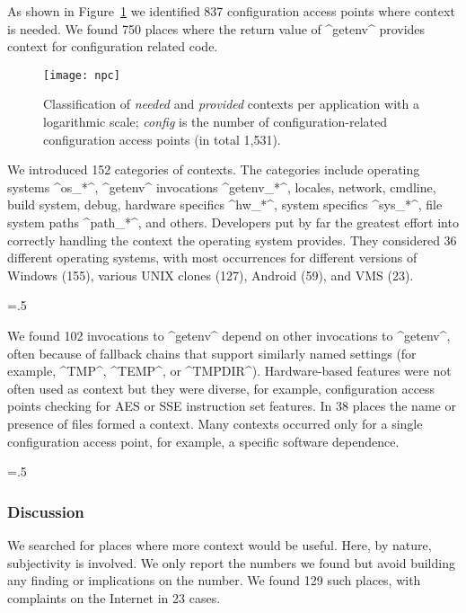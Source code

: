 As shown in Figure~\ref{fig:np} we identified 837 configuration access points where context is needed.
We found 750 places where the return value of ^getenv^ provides context for configuration related code.

\begin{figure}[htp]
\centering
\texttt{[image: npc]}
\caption[Classification of needed and provided contexts.]{%
Classification of \emph{needed} and \emph{provided} contexts per application with a logarithmic scale;
\emph{config} is the number of configuration-related configuration access points (in total 1,531).}
\label{fig:np}

\end{figure}

We introduced 152 categories of contexts.
The categories include operating systems ^os_*^, ^getenv^ invocations ^getenv_*^, locales, network, cmdline, build system, debug, hardware specifics ^hw_*^, system specifics ^sys_*^, file system paths ^path_*^, and others.
Developers put by far the greatest effort into correctly handling the context the operating system provides.
They considered 36 different operating systems, with most occurrences for different versions of Windows (155), various UNIX clones (127), Android (59), and VMS (23).%
{\parfillskip=0pt \emergencystretch=.5\textwidth \par}

We found 102 invocations to ^getenv^ depend on other invocations to ^getenv^, often because of fallback chains that support similarly named settings (for example, ^TMP^, ^TEMP^, or ^TMPDIR^).
Hardware-based features were not often used as context but they were diverse, for example, configuration access points checking for AES or SSE instruction set features.
In 38 places the name or presence of files formed a context.
Many contexts occurred only for a single configuration access point, for example, a specific software dependence.%
{\parfillskip=0pt \emergencystretch=.5\textwidth \par}

\subsubsection{Discussion}

We searched for places where more context would be useful.
Here, by nature, subjectivity is involved.
We only report the numbers we found but avoid building any finding or implications on the number.
We found 129 such places, with complaints on the Internet in 23 cases.

